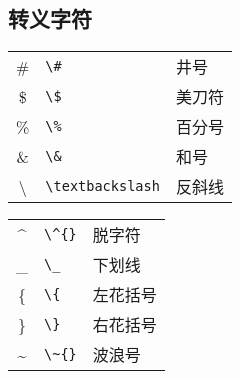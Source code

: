 \subsection{转义字符}
%
\begin{table}[h]
	\centering
	\begin{minipage}[t]{0.46\textwidth}
		\centering
		\begin{tabular}{c p{7em} p{5em}}
			\hline
			\#             & \verb|\#|             & 井号 \\
			\$             & \verb|\$|             & 美刀符 \\
			\%             & \verb|\%|             & 百分号 \\
			\&             & \verb|\&|             & 和号 \\
			\textbackslash & \verb|\textbackslash| & 反斜线 \\
			\hline
		\end{tabular}
	\end{minipage}
	\qquad
	\begin{minipage}[t]{0.46\textwidth}
		\centering
		\begin{tabular}{c p{7em} p{5em}}
			\hline
			\^{}           & \verb|\^{}|           & 脱字符 \\
			\_             & \verb|\_|             & 下划线 \\
			\{             & \verb|\{|             & 左花括号 \\
			\}             & \verb|\}|             & 右花括号 \\
			\~{}           & \verb|\~{}|           & 波浪号 \\
			\hline
		\end{tabular}
	\end{minipage}
\end{table}
%

